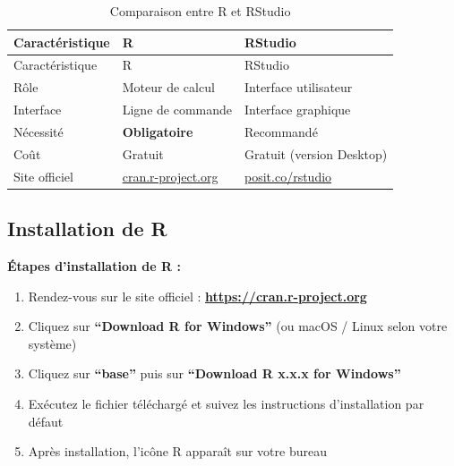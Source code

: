 \documentclass[
  french,
  11pt,
  a4paper,
]{article}
\providecommand{\tightlist}{%
  \setlength{\itemsep}{0pt}\setlength{\parskip}{0pt}}
\begin{document}
\begin{longtable}[]{@{}
  >{\raggedright\arraybackslash}p{}
  >{\raggedright\arraybackslash}p{}
  >{\raggedright\arraybackslash}p{}@{}}
\caption{Comparaison entre R et RStudio}\tabularnewline
\toprule\noalign{}
\begin{minipage}[b]{\linewidth}\raggedright
Caractéristique
\end{minipage} & \begin{minipage}[b]{\linewidth}\raggedright
R
\end{minipage} & \begin{minipage}[b]{\linewidth}\raggedright
RStudio
\end{minipage} \\
\midrule\noalign{}
\endfirsthead
\toprule\noalign{}
\begin{minipage}[b]{\linewidth}\raggedright
Caractéristique
\end{minipage} & \begin{minipage}[b]{\linewidth}\raggedright
R
\end{minipage} & \begin{minipage}[b]{\linewidth}\raggedright
RStudio
\end{minipage} \\
\midrule\noalign{}
\endhead
\bottomrule\noalign{}
\endlastfoot
Rôle & Moteur de calcul & Interface utilisateur \\
Interface & Ligne de commande & Interface graphique \\
Nécessité & \textbf{Obligatoire} & Recommandé \\
Coût & Gratuit & Gratuit (version Desktop) \\
Site officiel & \href{https://cran.r-project.org}{cran.r-project.org} &
\href{https://posit.co/products/open-source/rstudio/}{posit.co/rstudio} \\
\end{longtable}

\subsection{Installation de R}\label{installation-de-r}

\textbf{Étapes d'installation de R :}

\begin{enumerate}
\def\labelenumi{\arabic{enumi}.}
\tightlist
\item
  Rendez-vous sur le site officiel :
  \href{https://cran.r-project.org}{\textbf{https://cran.r-project.org}}
\item
  Cliquez sur \textbf{``Download R for Windows''} (ou macOS / Linux
  selon votre système)
\item
  Cliquez sur \textbf{``base''} puis sur \textbf{``Download R x.x.x for
  Windows''}
\item
  Exécutez le fichier téléchargé et suivez les instructions
  d'installation par défaut
\item
  Après installation, l'icône R apparaît sur votre bureau
\end{enumerate}
\end{document}
